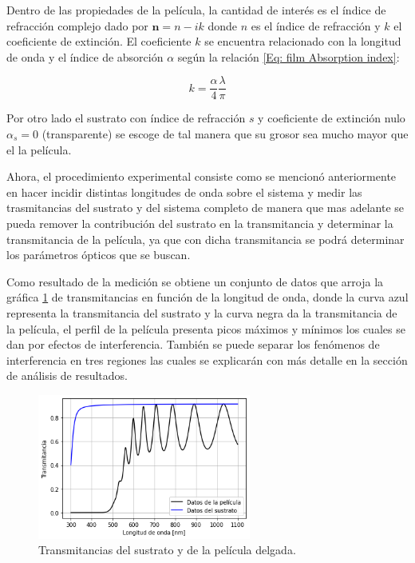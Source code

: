 \documentclass[article]{article}
\begin{document}
\begin{multicols}{2}
    Dentro de las propiedades de la película, la cantidad de interés es el índice de refracción complejo dado por $\textbf{n}=n-ik$ donde $n$ es el índice de refracción y $k$ el coeficiente de extinción. El coeficiente $k$ se encuentra relacionado con la longitud de onda y el índice de absorción $\alpha$ según la relación \ref{Eq: film Absorption index}:
    
    \begin{equation}
        k=\frac{\alpha}{4}\frac{\lambda}{\pi}
    \label{Eq: film Absorption index}
    \end{equation}

    Por otro lado el sustrato con índice de refracción $s$ y coeficiente de extinción nulo $\alpha_s=0$ (transparente) se escoge de tal manera que su grosor sea mucho mayor que el la película.

    Ahora, el procedimiento experimental consiste como se mencionó anteriormente en hacer incidir distintas longitudes de onda sobre el sistema y medir las trasmitancias del sustrato y del sistema completo de manera que mas adelante se pueda remover la contribución del sustrato en la transmitancia y determinar la transmitancia de la película, ya que con dicha transmitancia se podrá determinar los parámetros ópticos que se buscan. 

    Como resultado de la medición se obtiene un conjunto de datos que arroja la gráfica \ref{Fig: Datos} de transmitancias en función de la longitud de onda, donde la curva azul representa la transmitancia del sustrato y la curva negra da la transmitancia de la película, el perfil de la película presenta picos máximos y mínimos los cuales se dan por efectos de interferencia. También se puede separar los fenómenos de interferencia en tres regiones las cuales se explicarán con más detalle en la sección de análisis de resultados.
    
    \begin{figure}[H]
        \centering
        \includegraphics[width= 7cm]{Fig.png}
        \caption{Transmitancias del sustrato y de la película delgada.}
        \label{Fig: Datos}
    \end{figure}
    

\end{multicols}
\end{document}
